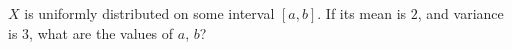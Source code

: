 \begin{problem}[Handout 12, \# 23]
  \(X\) is uniformly distributed on some interval \([a,b]\). If its mean is
  \(2\), and variance is \(3\), what are the values of \(a\), \(b\)?
\end{problem}
\begin{solution}

\end{solution}

